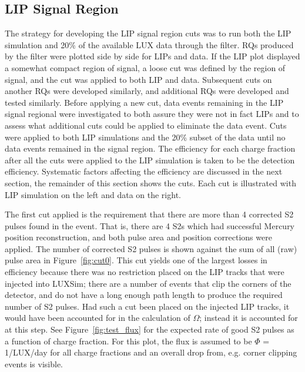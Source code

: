 \subsection{LIP Signal Region}
The strategy for developing the \ac{LIP} signal region cuts was to run both the \ac{LIP} simulation and 20\% of the available \ac{LUX} data through the filter. \ac{RQ}s produced by the filter were plotted side by side for \ac{LIP}s and data. If the \ac{LIP} plot displayed a somewhat compact region of signal, a loose cut was defined by the region of signal, and the cut was applied to both \ac{LIP} and data. Subsequent cuts on another \ac{RQ}s were developed similarly, and additional \ac{RQ}s were developed and tested similarly. Before applying a new cut, data events remaining in the \ac{LIP} signal regional were investigated to both assure they were not in fact \ac{LIP}s and to assess what additional cuts could be applied to eliminate the data event. Cuts were applied to both \ac{LIP} simulations and the 20\% subset of the data until no data events remained in the signal region. The efficiency for each charge fraction after all the cuts were applied to the \ac{LIP} simulation is taken to be the detection efficiency. Systematic factors affecting the efficiency are discussed in the next section, the remainder of this section shows the cuts. Each cut is illustrated with \ac{LIP} simulation on the left and data on the right.

The first cut applied is the requirement that there are more than 4 corrected S2 pulses found in the event. That is, there are 4 S2s which had successful Mercury position reconstruction, and both pulse area and position corrections were applied. The number of corrected S2 pulses is shown against the sum of all (raw) pulse area in Figure~\ref{fig:cut0}. This cut yields one of the largest losses in efficiency because there was no restriction placed on the \ac{LIP} tracks that were injected into LUXSim; there are a number of events that clip the corners of the detector, and do not have a long enough path length to produce the required number of S2 pulses. Had such a cut been placed on the injected \ac{LIP} tracks, it would have been accounted for in the calculation of $\Omega$; instead it is accounted for at this step. See Figure~\ref{fig:test_flux} for the expected rate of good S2 pulses as a function of charge fraction. For this plot, the flux is assumed to be $\Phi$ = 1/\ac{LUX}/day for all charge fractions and an overall drop from, e.g. corner clipping events is visible. 

